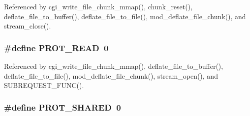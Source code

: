 Referenced by cgi\-\_\-write\-\_\-file\-\_\-chunk\-\_\-mmap(), chunk\-\_\-reset(), deflate\-\_\-file\-\_\-to\-\_\-buffer(), deflate\-\_\-file\-\_\-to\-\_\-file(), mod\-\_\-deflate\-\_\-file\-\_\-chunk(), and stream\-\_\-close().

\hypertarget{sys-mmap_8h_a15bf68ce8b590838b3a5c0b639d8d519}{
\subsubsection[{P\-R\-O\-T\-\_\-\-R\-E\-A\-D}]{\setlength{\rightskip}{0pt plus 5cm}\#define P\-R\-O\-T\-\_\-\-R\-E\-A\-D~0}}\label{sys-mmap_8h_a15bf68ce8b590838b3a5c0b639d8d519}


Referenced by cgi\-\_\-write\-\_\-file\-\_\-chunk\-\_\-mmap(), deflate\-\_\-file\-\_\-to\-\_\-buffer(), deflate\-\_\-file\-\_\-to\-\_\-file(), mod\-\_\-deflate\-\_\-file\-\_\-chunk(), stream\-\_\-open(), and S\-U\-B\-R\-E\-Q\-U\-E\-S\-T\-\_\-\-F\-U\-N\-C().

\hypertarget{sys-mmap_8h_add91c44c535e724eb143036587437411}{
\subsubsection[{P\-R\-O\-T\-\_\-\-S\-H\-A\-R\-E\-D}]{\setlength{\rightskip}{0pt plus 5cm}\#define P\-R\-O\-T\-\_\-\-S\-H\-A\-R\-E\-D~0}}\label{sys-mmap_8h_add91c44c535e724eb143036587437411}
